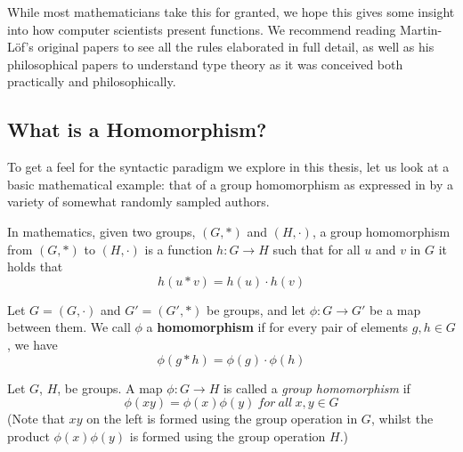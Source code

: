 While most mathematicians take this for granted, we hope this gives some insight
into how computer scientists present functions. We recommend reading
Martin-Löf's original papers \cite{ml1984} \cite{ml79} to see all the rules
elaborated in full detail, as well as his philosophical papers
\cite{mlMeanings} \cite{mlTruth} to understand type theory as it was conceived
both practically and philosophically.


\subsection{What is a Homomorphism?}

To get a feel for the syntactic paradigm we explore in this thesis, let us look at a basic mathematical
example: that of a group homomorphism as expressed in by a variety of somewhat
randomly sampled authors.  


\begin{definition}
In mathematics, given two groups, $(G, \ast)$ and $(H, \cdot)$, a group homomorphism from $(G, \ast)$ to $(H, \cdot)$ is a function $h : G \to H$ such that for all $u$ and $v$ in $G$ it holds that
  $$h(u \ast v) = h ( u ) \cdot h ( v )$$ 
\end{definition}


\begin{definition}
Let $G = (G,\cdot)$ and $G' = (G',\ast)$ be groups, and let $\phi : G \to G'$ be a map between them. We call $\phi$ a \textbf{homomorphism} if for every pair of elements $g, h \in G$, we have 
  $$\phi(g \ast h) = \phi ( g ) \cdot \phi ( h )$$ 
\end{definition}


\begin{definition}\label{def:def3}
Let $G$, $H$, be groups.  A map $\phi : G \to H$ is called a \emph{group homomorphism} if
  $$\phi(xy) = \phi ( x ) \phi ( y )\ for\ all\ x, y \in G$$ 
(Note that $xy$ on the left is formed using the group operation in $G$, whilst the product $\phi ( x ) \phi ( y )$ is formed using the group operation $H$.)
\end{definition}

